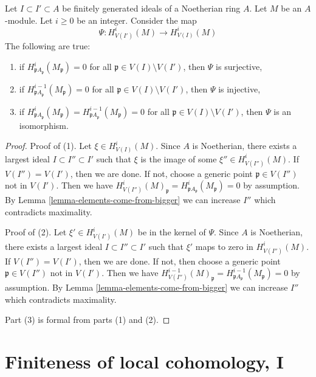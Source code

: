 \begin{lemma}
\label{lemma-isomorphism}
Let $I \subset I' \subset A$ be finitely generated ideals of a
Noetherian ring $A$. Let $M$ be an $A$-module. Let $i \geq 0$ be an integer.
Consider the map
$$
\Psi : H^i_{V(I')}(M) \to H^i_{V(I)}(M)
$$
The following are true:
\begin{enumerate}
\item if $H^i_{\mathfrak pA_\mathfrak p}(M_\mathfrak p) = 0$
for all $\mathfrak p \in V(I) \setminus V(I')$, then
$\Psi$ is surjective,
\item if $H^{i - 1}_{\mathfrak pA_\mathfrak p}(M_\mathfrak p) = 0$
for all $\mathfrak p \in V(I) \setminus V(I')$, then
$\Psi$ is injective,
\item if $H^i_{\mathfrak pA_\mathfrak p}(M_\mathfrak p) =
H^{i - 1}_{\mathfrak pA_\mathfrak p}(M_\mathfrak p) = 0$
for all $\mathfrak p \in V(I) \setminus V(I')$, then
$\Psi$ is an isomorphism.
\end{enumerate}
\end{lemma}

\begin{proof}
Proof of (1).
Let $\xi \in H^i_{V(I)}(M)$. Since $A$ is Noetherian, there exists a
largest ideal $I \subset I'' \subset I'$ such that $\xi$ is the image
of some $\xi'' \in H^i_{V(I'')}(M)$. If $V(I'') = V(I')$, then we are
done. If not, choose a generic point $\mathfrak p \in V(I'')$ not in $V(I')$.
Then we have $H^i_{V(I'')}(M)_\mathfrak p =
H^i_{\mathfrak pA_\mathfrak p}(M_\mathfrak p) = 0$ by assumption.
By Lemma \ref{lemma-elements-come-from-bigger} we can increase $I''$
which contradicts maximality.

\medskip\noindent
Proof of (2). Let $\xi' \in H^i_{V(I')}(M)$ be in the kernel of $\Psi$.
Since $A$ is Noetherian, there exists a
largest ideal $I \subset I'' \subset I'$ such that $\xi'$
maps to zero in $H^i_{V(I'')}(M)$. If $V(I'') = V(I')$, then we are
done. If not, then choose a generic point $\mathfrak p  \in V(I'')$
not in $V(I')$. Then we have $H^{i - 1}_{V(I'')}(M)_\mathfrak p =
H^{i - 1}_{\mathfrak pA_\mathfrak p}(M_\mathfrak p) = 0$ by assumption.
By Lemma \ref{lemma-elements-come-from-bigger} we can increase $I''$
which contradicts maximality.

\medskip\noindent
Part (3) is formal from parts (1) and (2).
\end{proof}





\section{Finiteness of local cohomology, I}
\label{section-finiteness}

